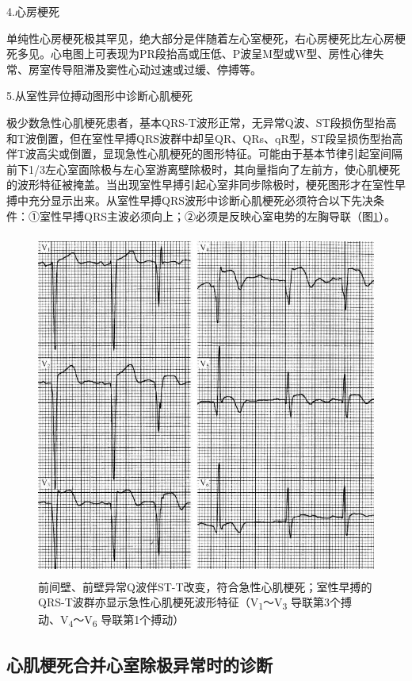 4.心房梗死

单纯性心房梗死极其罕见，绝大部分是伴随着左心室梗死，右心房梗死比左心房梗死多见。心电图上可表现为PR段抬高或压低、P波呈M型或W型、房性心律失常、房室传导阻滞及窦性心动过速或过缓、停搏等。

5.从室性异位搏动图形中诊断心肌梗死

极少数急性心肌梗死患者，基本QRS-T波形正常，无异常Q波、ST段损伤型抬高和T波倒置，但在室性早搏QRS波群中却呈QR、QRs、qR型，ST段呈损伤型抬高伴T波高尖或倒置，显现急性心肌梗死的图形特征。可能由于基本节律引起室间隔前下1/3左心室面除极与左心室游离壁除极时，其向量指向了左前方，使心肌梗死的波形特征被掩盖。当出现室性早搏引起心室非同步除极时，梗死图形才在室性早搏中充分显示出来。从室性早搏QRS波形中诊断心肌梗死必须符合以下先决条件：①室性早搏QRS主波必须向上；②必须是反映心室电势的左胸导联（图\ref{fig44-14}）。

\begin{figure}[!htbp]
 \centering
 \includegraphics[width=4.58333in,height=4.46875in]{./images/Image00722.jpg}
 \captionsetup{justification=centering}
 \caption{前间壁、前壁异常Q波伴ST-T改变，符合急性心肌梗死；室性早搏的QRS-T波群亦显示急性心肌梗死波形特征（V\textsubscript{1}～V\textsubscript{3} 导联第3个搏动、V\textsubscript{4}～V\textsubscript{6} 导联第1个搏动）}
 \label{fig44-14}
  \end{figure} 


\protect\hypertarget{text00052.htmlux5cux23subid629}{}{}

\subsection{心肌梗死合并心室除极异常时的诊断}

